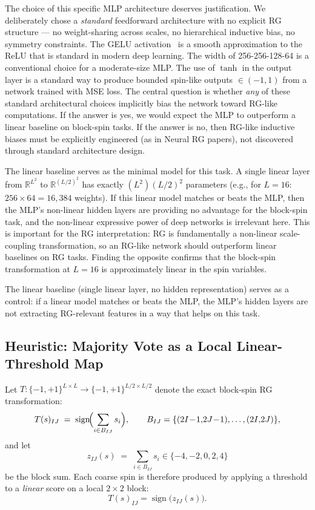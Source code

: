 \documentclass[12pt,a4paper]{memoir}
\def\reals{{\mathbb R}}
\begin{document}
The choice of this specific MLP architecture deserves justification.  We
deliberately chose a \emph{standard} feedforward architecture with no
explicit RG structure --- no weight-sharing across scales, no hierarchical
inductive bias, no symmetry constraints.  The GELU activation~\citep{hendrycks2016gaussian}
is a smooth approximation to the ReLU that is standard in modern deep learning.
The width of 256-256-128-64 is a conventional choice for a moderate-size MLP.
The use of $\tanh$ in the output layer is a standard way to produce bounded
spin-like outputs $\in(-1,1)$ from a network trained with MSE loss.  The
central question is whether \emph{any} of these standard architectural
choices implicitly bias the network toward RG-like computations.  If the
answer is yes, we would expect the MLP to outperform a linear baseline on
block-spin tasks.  If the answer is no, then RG-like inductive biases must
be explicitly engineered (as in Neural RG papers), not discovered through
standard architecture design.

The linear baseline serves as the minimal model for this task.  A single
linear layer from $\reals^{L^2}$ to $\reals^{(L/2)^2}$ has exactly $(L^2)(L/2)^2$
parameters (e.g., for $L=16$: $256 \times 64 = 16{,}384$ weights).  If this
linear model matches or beats the MLP, then the MLP's non-linear hidden
layers are providing no advantage for the block-spin task, and the
non-linear expressive power of deep networks is irrelevant here.  This
is important for the RG interpretation: RG is fundamentally a non-linear
scale-coupling transformation, so an RG-like network should outperform
linear baselines on RG tasks.  Finding the opposite confirms that the
block-spin transformation at $L=16$ is approximately linear in the spin
variables.

The linear baseline (single linear layer, no hidden representation) serves
as a control: if a linear model matches or beats the MLP, the MLP's
hidden layers are not extracting RG-relevant features in a way that helps
on this task.

\subsection{Heuristic: Majority Vote as a Local Linear-Threshold Map}
\label{sec:linear-rg-approx}

Let $T : \{-1,+1\}^{L\times L} \to \{-1,+1\}^{L/2\times L/2}$
denote the exact block-spin RG transformation:
\begin{equation}
  T(s)_{IJ} \;=\; \operatorname{sign}\!\Bigl(\sum_{i\in B_{IJ}} s_i\Bigr),
  \qquad B_{IJ} = \{(2I\!-\!1,\!2J\!-\!1),\ldots,(2I,\!2J)\},
\end{equation}
and let
\begin{equation}
  z_{IJ}(s) \;=\; \sum_{i\in B_{IJ}} s_i \in \{-4,-2,0,2,4\}
\end{equation}
be the block sum.  Each coarse spin is therefore produced by applying a
threshold to a \emph{linear} score on a local $2\times2$ block:
\begin{equation}
  T(s)_{IJ} = \operatorname{sign}\!\bigl(z_{IJ}(s)\bigr).
\end{equation}
\end{document}
